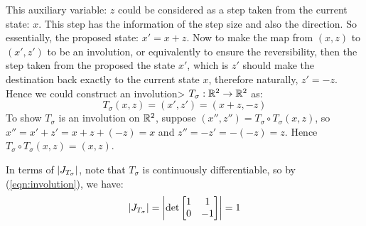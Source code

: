 \documentclass{article}
\begin{document}



This auxiliary variable: $z$ could be considered as a step taken from the current state: $x$. This step has the information of the step size and also the direction. So essentially, the proposed state: $x' = x + z$. Now to make the map from $(x, z)$ to $(x', z')$ to be an involution, or equivalently to ensure the reversibility, then the step taken from the proposed the state $x'$, which is $z'$ should make the destination back exactly to the current state $x$, therefore naturally, $z' = -z$. Hence we could construct an involution> $T_{\sigma}: \mathbb R^2 \to \mathbb R^2$ as:
\begin{equation}
    T_{\sigma}(x, z) = (x', z') = (x + z, -z) \label{eqn:involution}
\end{equation}
To show $T_{\sigma}$ is an involution on $\mathbb R^2$, suppose $(x'', z'') = T_{\sigma}\circ T_{\sigma}(x, z)$, so $x'' = x' + z' = x + z + (-z) = x$ and $z'' = -z' = -(-z) = z$. Hence $T_{\sigma}\circ T_{\sigma}(x, z) = (x, z)$.

In terms of $\left|J_{T_{\sigma}}\right|$, note that $T_{\sigma}$ is continuously differentiable, so by (\ref{eqn:involution}), we have: \[\left|J_{T_{\sigma}}\right| = \left|\text{det}\begin{bmatrix}
1 & 1\\0 & -1
\end{bmatrix}\right| = 1\]
 
\end{document}

